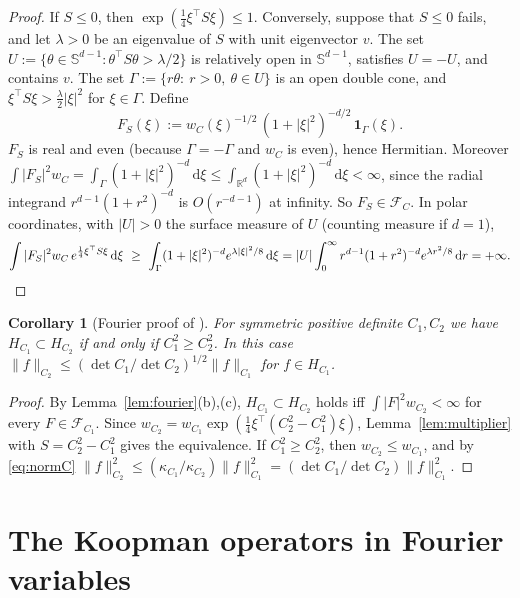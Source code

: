 \documentclass[11pt]{article}
\newtheorem{corollary}[lemma]{Corollary}
\theoremstyle{definition}
\theoremstyle{remark}
\newcommand{\R}{\mathbb{R}}
\newcommand{\Sph}{\mathbb{S}}
\newcommand{\dd}{\,\mathrm{d}}
\newcommand{\FC}[1]{\mathcal{F}_{#1}}
\newcommand{\tp}{\top}
\begin{document}
\begin{proof}
If $S\le0$, then $\exp(\frac14\xi^\tp S\xi)\le1$. Conversely, suppose that $S\le0$ fails, and let $\lambda>0$ be an
eigenvalue of $S$ with unit eigenvector $v$. The set $U:=\{\theta\in\Sph^{d-1}:\theta^\tp S\theta>\lambda/2\}$ is relatively open in $\Sph^{d-1}$, satisfies $U=-U$, and contains $v$.
The set $\Gamma:=\{r\theta:\ r>0,\ \theta\in U\}$ is an open double cone, and $\xi^\tp S\xi>\frac\lambda2|\xi|^2$ for
$\xi\in\Gamma$. Define
\[
F_S(\xi):=w_C(\xi)^{-1/2}\,(1+|\xi|^2)^{-d/2}\,\mathbf 1_\Gamma(\xi).
\]
$F_S$ is real and even (because $\Gamma=-\Gamma$ and $w_C$ is even), hence Hermitian. Moreover
$\int|F_S|^2w_C=\int_\Gamma(1+|\xi|^2)^{-d}\dd\xi\le\int_{\R^d}(1+|\xi|^2)^{-d}\dd\xi<\infty$, since the radial integrand
$r^{d-1}(1+r^2)^{-d}$ is $O(r^{-d-1})$ at infinity. So $F_S\in\FC{C}$. In polar coordinates, with $|U|>0$ the surface
measure of $U$ (counting measure if $d=1$),
\[
\int|F_S|^2w_C\,e^{\frac14\xi^\tp S\xi}\dd\xi\ \ge\ \int_\Gamma(1+|\xi|^2)^{-d}e^{\lambda|\xi|^2/8}\dd\xi
=|U|\int_0^\infty r^{d-1}(1+r^2)^{-d}e^{\lambda r^2/8}\dd r=+\infty. \qedhere
\]
\end{proof}

\begin{corollary}[Fourier proof of {\cite[Proposition~3.3]{PSWPN}}]\label{cor:inclusion}
For symmetric positive definite $C_1,C_2$ we have $H_{C_1}\subset H_{C_2}$ if and only if $C_1^2\ge C_2^2$. In
this case $\|f\|_{C_2}\le(\det C_1/\det C_2)^{1/2}\|f\|_{C_1}$ for $f\in H_{C_1}$.
\end{corollary}

\begin{proof}
By Lemma~\ref{lem:fourier}(b),(c), $H_{C_1}\subset H_{C_2}$ holds iff $\int|F|^2w_{C_2}<\infty$ for every
$F\in\FC{C_1}$. Since $w_{C_2}=w_{C_1}\exp(\frac14\xi^\tp(C_2^2-C_1^2)\xi)$, Lemma~\ref{lem:multiplier} with
$S=C_2^2-C_1^2$ gives the equivalence. If $C_1^2\ge C_2^2$, then $w_{C_2}\le w_{C_1}$, and by \eqref{eq:normC}
$\|f\|_{C_2}^2\le(\kappa_{C_1}/\kappa_{C_2})\|f\|_{C_1}^2=(\det C_1/\det C_2)\|f\|_{C_1}^2$.
\end{proof}

\section{The Koopman operators in Fourier variables}\label{sec:koopman}
\end{document}
